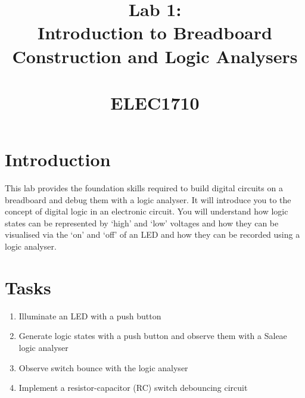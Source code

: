 \documentclass{UoNMCHA}
\numberwithin{equation}{section}
\begin{document}
\title{Lab 1:\\Introduction to Breadboard Construction and Logic Analysers \\ \ \\
{\small ELEC1710   \\ 
}}
\maketitle
\onecolumn

\vspace{-5mm}

\section{Introduction}

This lab provides the foundation skills required to build digital circuits on a breadboard and debug them with a logic analyser. It will introduce you to the concept of digital logic in an electronic circuit. You will understand how logic states can be represented by `high' and `low' voltages and how they can be visualised via the `on' and `off' of an LED and how they can be recorded using a logic analyser. 

\section{Tasks}

\begin{enumerate}
    \item Illuminate an LED with a push button
    \item Generate logic states with a push button and observe them with a Saleae logic analyser
    \item Observe switch bounce with the logic analyser
    \item Implement a resistor-capacitor (RC) switch debouncing circuit
\end{enumerate}
\end{document}
